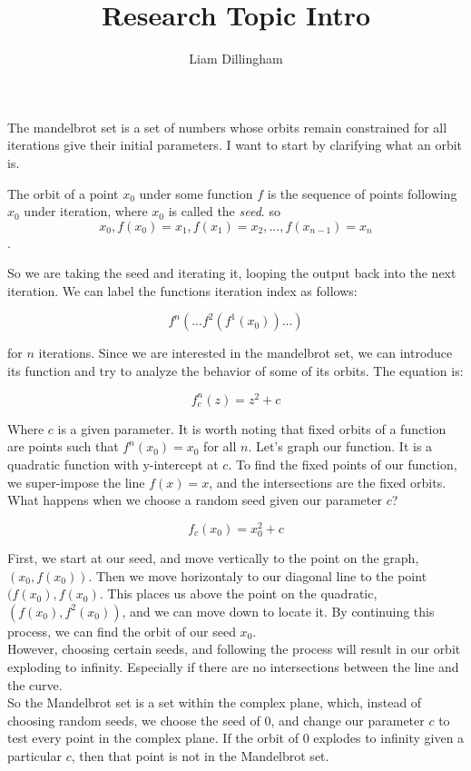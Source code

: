 \documentclass[20pt]{article} %
\title{Research Topic Intro}
\author{Liam Dillingham}
\begin{document}
\maketitle

The mandelbrot set is a set of numbers whose orbits remain constrained for all iterations give their initial parameters. I want to start by clarifying what an orbit is.  

The orbit of a point $x_0$ under some function $f$ is the sequence of points following $x_0$ under iteration, where $x_0$ is called the \textit{seed}. so 
$$x_0, f(x_0)=x_1, f(x_1)=x_2, ..., f(x_{n-1})=x_n$$.

So we are taking the seed and iterating it, looping the output back into the next iteration. We can label the functions iteration index as follows:

$$f^{n}(...f^{2}(f^{1}(x_0))...)$$

for $n$ iterations.  Since we are interested in the mandelbrot set, we can introduce its function and try to analyze the behavior of some of its orbits.  The equation is:

$$f_c^{n}(z) = z^{2} +c$$

Where $c$ is a given parameter.  It is worth noting that fixed orbits of a function are points such that $f^{n}(x_0)=x_0$ for all $n$.  Let's graph our function.  It is a quadratic function with y-intercept at $c$. To find the fixed points of our function, we super-impose the line $f(x)=x$, and the intersections are the fixed orbits.  What happens when we choose a random seed given our parameter $c$? 

$$ f_c(x_0)=x_0^{2}+c$$

First, we start at our seed, and move vertically to the point on the graph, $(x_0, f(x_0))$.  Then we move horizontaly to our diagonal line to the point $(f(x_0),f(x_0)$.  This places us above the point on the quadratic, $(f(x_0), f^{2}(x_0))$, and we can move down to locate it.  By continuing this process, we can find the orbit of our seed $x_0$. \\ 

However, choosing certain seeds, and following the process will result in our orbit exploding to infinity.  Especially if there are no intersections between the line and the curve. \\ 

So the Mandelbrot set is a set within the complex plane, which, instead of choosing random seeds, we choose the seed of 0, and change our parameter $c$ to test every point in the complex plane.  If the orbit of 0 explodes to infinity given a particular $c$, then that point is not in the Mandelbrot set.
\end{document}
